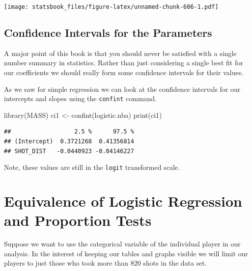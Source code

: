 \documentclass[
]{book}
\newenvironment{Shaded}{\begin{snugshade}}{\end{snugshade}}
\newcommand{\FunctionTok}[1]{\textcolor[rgb]{0.00,0.00,0.00}{#1}}
\newcommand{\NormalTok}[1]{#1}
\newcommand{\OtherTok}[1]{\textcolor[rgb]{0.56,0.35,0.01}{#1}}
\theoremstyle{definition}
\theoremstyle{definition}
\theoremstyle{definition}
\theoremstyle{definition}
\theoremstyle{remark}
\begin{document}
\texttt{[image: statsbook\_files/figure-latex/unnamed-chunk-606-1.pdf]}

\hypertarget{confidence-intervals-for-the-parameters}{%
\subsection{Confidence Intervals for the Parameters}\label{confidence-intervals-for-the-parameters}}

A major point of this book is that you should never be satisfied with a single number summary in statistics. Rather than just considering a single best fit for our coefficients we should really form some confidence intervals for their values.

As we saw for simple regression we can look at the confidence intervals for our intercepts and slopes using the \texttt{confint} command.

\begin{Shaded}
\begin{Highlighting}[]
\FunctionTok{library}\NormalTok{(MASS)}
\NormalTok{ci1 }\OtherTok{\textless{}{-}} \FunctionTok{confint}\NormalTok{(logistic.nba)}
\FunctionTok{print}\NormalTok{(ci1)}
\end{Highlighting}
\end{Shaded}

\begin{verbatim}
##                  2.5 %      97.5 %
## (Intercept)  0.3721268  0.41356814
## SHOT_DIST   -0.0440923 -0.04146227
\end{verbatim}

Note, these values are still in the \texttt{logit} transformed scale.

\hypertarget{equivalence-of-logistic-regression-and-proportion-tests}{%
\section{Equivalence of Logistic Regression and Proportion Tests}\label{equivalence-of-logistic-regression-and-proportion-tests}}

Suppose we want to use the categorical variable of the individual player in our analysis. In the interest of keeping our tables and graphs visible we will limit our players to just those who took more than 820 shots in the data set.
\end{document}
